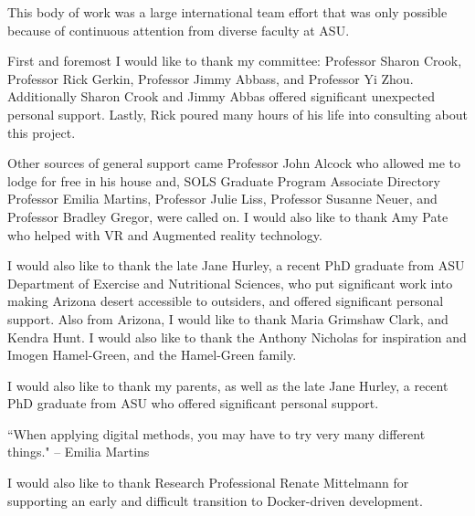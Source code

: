 This body of work was a large international team effort that was only possible because of continuous attention from diverse faculty at ASU. 
\linebreak 

First and foremost I would like to thank my committee: Professor Sharon Crook, Professor Rick Gerkin, Professor Jimmy Abbass, and Professor Yi Zhou. 
Additionally Sharon Crook and Jimmy Abbas offered significant unexpected personal support.
Lastly, Rick poured many hours of his life into consulting about this project.
\linebreak 

Other sources of general support came Professor John Alcock who allowed me to lodge for free in his house and, SOLS Graduate Program Associate Directory Professor Emilia Martins, Professor Julie Liss, Professor Susanne Neuer, and Professor Bradley Gregor, were called on. I would also like to thank Amy Pate who helped with VR and Augmented reality technology.
\linebreak 

I would also like to thank the late Jane Hurley, a recent PhD graduate from ASU Department of Exercise and Nutritional Sciences, who put significant work into making Arizona desert accessible to outsiders, and offered significant personal support. Also from Arizona, I would like to thank Maria Grimshaw Clark, and Kendra Hunt.
I would also like to thank the Anthony Nicholas for inspiration and Imogen Hamel-Green, and the Hamel-Green family.
\linebreak 

I would also like to thank my parents, as well as the late Jane Hurley, a recent PhD graduate from ASU who offered significant personal support.
\linebreak 

``When applying digital methods, you may have to try very many different things." -- Emilia Martins
\linebreak 

I would also like to thank Research Professional Renate Mittelmann for supporting an early and difficult transition to Docker-driven development.
